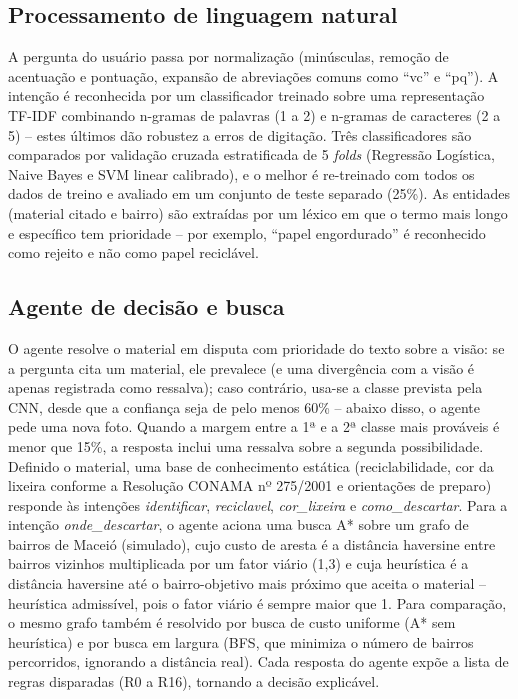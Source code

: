 \documentclass[conference]{IEEEtran}
\begin{document}
\subsection{Processamento de linguagem natural}

A pergunta do usuário passa por normalização (minúsculas, remoção de acentuação e pontuação,
expansão de abreviações comuns como ``vc'' e ``pq''). A intenção é reconhecida por um
classificador treinado sobre uma representação TF-IDF combinando n-gramas de palavras (1 a 2)
e n-gramas de caracteres (2 a 5) -- estes últimos dão robustez a erros de digitação. Três
classificadores são comparados por validação cruzada estratificada de 5 \textit{folds}
(Regressão Logística, Naive Bayes e SVM linear calibrado), e o melhor é re-treinado com todos
os dados de treino e avaliado em um conjunto de teste separado (25\%). As entidades
(material citado e bairro) são extraídas por um léxico em que o termo mais longo e específico
tem prioridade -- por exemplo, ``papel engordurado'' é reconhecido como rejeito e não como
papel reciclável.

\subsection{Agente de decisão e busca}

O agente resolve o material em disputa com prioridade do texto sobre a visão: se a pergunta
cita um material, ele prevalece (e uma divergência com a visão é apenas registrada como
ressalva); caso contrário, usa-se a classe prevista pela CNN, desde que a confiança seja de
pelo menos 60\% -- abaixo disso, o agente pede uma nova foto. Quando a margem entre a 1ª e a
2ª classe mais prováveis é menor que 15\%, a resposta inclui uma ressalva sobre a segunda
possibilidade. Definido o material, uma base de conhecimento estática (reciclabilidade, cor
da lixeira conforme a Resolução CONAMA nº 275/2001 e orientações de preparo) responde às
intenções \textit{identificar}, \textit{reciclavel}, \textit{cor\_lixeira} e
\textit{como\_descartar}. Para a intenção \textit{onde\_descartar}, o agente aciona uma busca
A* sobre um grafo de bairros de Maceió (simulado), cujo custo de aresta é a distância
haversine entre bairros vizinhos multiplicada por um fator viário (1,3) e cuja heurística é a
distância haversine até o bairro-objetivo mais próximo que aceita o material -- heurística
admissível, pois o fator viário é sempre maior que 1. Para comparação, o mesmo grafo também é
resolvido por busca de custo uniforme (A* sem heurística) e por busca em largura (BFS, que
minimiza o número de bairros percorridos, ignorando a distância real). Cada resposta do
agente expõe a lista de regras disparadas (R0 a R16), tornando a decisão explicável.
\end{document}
